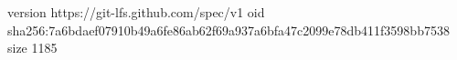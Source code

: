 version https://git-lfs.github.com/spec/v1
oid sha256:7a6bdaef07910b49a6fe86ab62f69a937a6bfa47c2099e78db411f3598bb7538
size 1185
